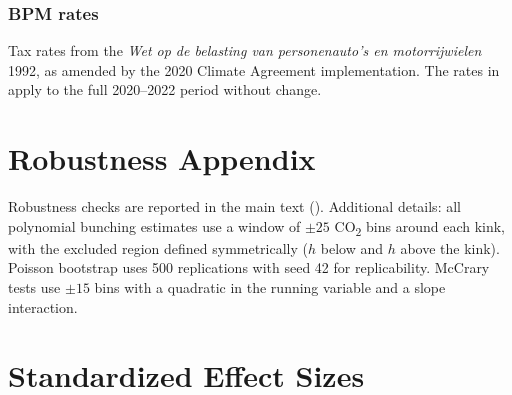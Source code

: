 \documentclass[12pt]{article}
\begin{document}
\subsubsection*{BPM rates} Tax rates from the \textit{Wet op de belasting van personenauto's en motorrijwielen} 1992, as amended by the 2020 Climate Agreement implementation. The rates in  apply to the full 2020--2022 period without change.

\section{Robustness Appendix}

Robustness checks are reported in the main text (). Additional details: all polynomial bunching estimates use a window of $\pm 25$ CO\textsubscript{2} bins around each kink, with the excluded region defined symmetrically ($h$ below and $h$ above the kink). Poisson bootstrap uses 500 replications with seed 42 for replicability. McCrary tests use $\pm 15$ bins with a quadratic in the running variable and a slope interaction.

\section{Standardized Effect Sizes}
\label{sec:sde}


\end{document}
